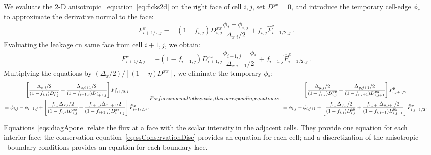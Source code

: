 We evaluate the 2-D anisotropic \Pone\ equation~\eqref{eq:ficks2d} on the right
face of cell $i,j$, set $D^{yx}=0$, and introduce the temporary cell-edge
$\phi_*$ to approximate the derivative normal to the face:
\begin{equation*}
  F_{i+1/2,j}^{x} =
  - (1 - f_{i,j})D_{i,j}^{xx} \frac{\phi_* - \phi_{i,j}}{\Delta_{x,i}/2}
  + f_{i,j} \hat{F}_{i+1/2,j}^{x} \,.
\end{equation*}
Evaluating the leakage on same face from cell $i+1,j$, we obtain:
\begin{equation*}
  F_{i+1/2,j}^{x} =
  - (1 - f_{i+1,j})D_{i+1,j}^{xx} \frac{\phi_{i+1,j} - \phi_*}{\Delta_{x,i+1}/2}
  +  f_{i+1,j} \hat{F}_{i+1/2,j}^{x} \,.
\end{equation*}
Multiplying the equations by $(\Delta_{x} / 2) / [(1 - \eta) D^{xx}]$, we eliminate
the temporary $\phi_*$:
\begin{subequations}\label{eqs:diagApone}
\begin{multline}\label{eq:diagAponeX}
  \left[
    \frac{\Delta_{x,i}/2}{(1 - f_{i,j})D_{i,j}^{xx}}
  + \frac{\Delta_{x,i+1}/2}{(1 - f_{i+1,j})D_{i+1,j}^{xx}} \right]
  F_{i+1/2,j}^{x}
  \\ = \phi_{i,j} - \phi_{i+1,j}
  + \left[
    \frac{f_{i,j} \Delta_{x,i}/2}{(1 - f_{i,j})D_{i,j}^{xx}}
  + \frac{f_{i+1,j} \Delta_{x,i+1}/2}{(1 - f_{i+1,j})D_{i+1,j}^{xx}}
  \right] \hat{F}_{i+1/2,j}^{x}  \,.
\end{multline}
For faces normal to the $y$ axis, the corresponding equation is:
\begin{multline}\label{eq:diagAponeX}
  \left[
    \frac{\Delta_{y,j}/2}{(1 - f_{i,j})D_{i,j}^{yy}}
  + \frac{\Delta_{y,j+1}/2}{(1 - f_{i,j+1})D_{i,j+1}^{yy}} \right]
  F_{i,j+1/2}^{y}
  \\ = \phi_{i,j} - \phi_{i,j+1}
  + \left[
    \frac{f_{i,j} \Delta_{y,j}/2}{(1 - f_{i,j})D_{i,j}^{yy}}
  + \frac{f_{i,j+1} \Delta_{y,j+1}/2}{(1 - f_{i,j+1})D_{i,j+1}^{yy}}
  \right] \hat{F}_{i,j+1/2}^{y}  \,.
\end{multline}
\end{subequations}

Equations~\eqref{eqs:diagApone} relate the flux at a face with the scalar
intensity in the adjacent cells. They provide one equation for each interior
face; the conservation equation~\eqref{eq:ssConservationDisc} provides an
equation for each cell; and a discretization of the anisotropic \Pone\ boundary
conditions provides an equation for each boundary face.

